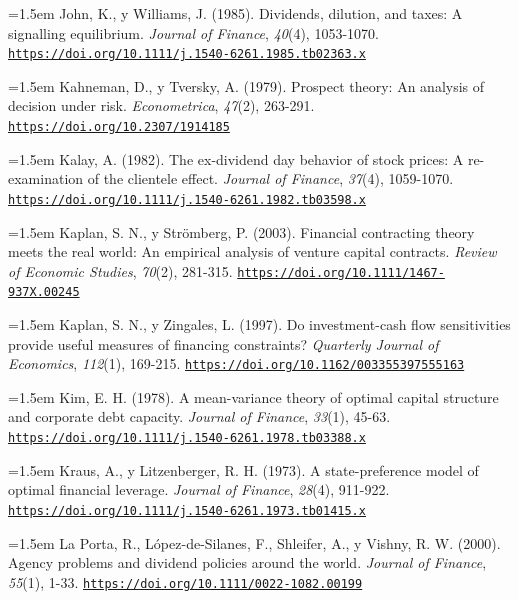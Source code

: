 \documentclass[10pt,a4paper]{article}
\begin{document}
\noindent\hangindent=1.5em John, K., y Williams, J. (1985). Dividends, dilution, and taxes: A signalling equilibrium. \textit{Journal of Finance}, \textit{40}(4), 1053-1070. \href{https://doi.org/10.1111/j.1540-6261.1985.tb02363.x}{\nolinkurl{https://doi.org/10.1111/j.1540-6261.1985.tb02363.x}}

\noindent\hangindent=1.5em Kahneman, D., y Tversky, A. (1979). Prospect theory: An analysis of decision under risk. \textit{Econometrica}, \textit{47}(2), 263-291. \href{https://doi.org/10.2307/1914185}{\nolinkurl{https://doi.org/10.2307/1914185}}

\noindent\hangindent=1.5em Kalay, A. (1982). The ex-dividend day behavior of stock prices: A re-examination of the clientele effect. \textit{Journal of Finance}, \textit{37}(4), 1059-1070. \href{https://doi.org/10.1111/j.1540-6261.1982.tb03598.x}{\nolinkurl{https://doi.org/10.1111/j.1540-6261.1982.tb03598.x}}

\noindent\hangindent=1.5em Kaplan, S. N., y Strömberg, P. (2003). Financial contracting theory meets the real world: An empirical analysis of venture capital contracts. \textit{Review of Economic Studies}, \textit{70}(2), 281-315. \href{https://doi.org/10.1111/1467-937X.00245}{\nolinkurl{https://doi.org/10.1111/1467-937X.00245}}

\noindent\hangindent=1.5em Kaplan, S. N., y Zingales, L. (1997). Do investment-cash flow sensitivities provide useful measures of financing constraints? \textit{Quarterly Journal of Economics}, \textit{112}(1), 169-215. \href{https://doi.org/10.1162/003355397555163}{\nolinkurl{https://doi.org/10.1162/003355397555163}}

\noindent\hangindent=1.5em Kim, E. H. (1978). A mean-variance theory of optimal capital structure and corporate debt capacity. \textit{Journal of Finance}, \textit{33}(1), 45-63. \href{https://doi.org/10.1111/j.1540-6261.1978.tb03388.x}{\nolinkurl{https://doi.org/10.1111/j.1540-6261.1978.tb03388.x}}

\noindent\hangindent=1.5em Kraus, A., y Litzenberger, R. H. (1973). A state-preference model of optimal financial leverage. \textit{Journal of Finance}, \textit{28}(4), 911-922. \href{https://doi.org/10.1111/j.1540-6261.1973.tb01415.x}{\nolinkurl{https://doi.org/10.1111/j.1540-6261.1973.tb01415.x}}

\noindent\hangindent=1.5em La Porta, R., López-de-Silanes, F., Shleifer, A., y Vishny, R. W. (2000). Agency problems and dividend policies around the world. \textit{Journal of Finance}, \textit{55}(1), 1-33. \href{https://doi.org/10.1111/0022-1082.00199}{\nolinkurl{https://doi.org/10.1111/0022-1082.00199}}
\end{document}
